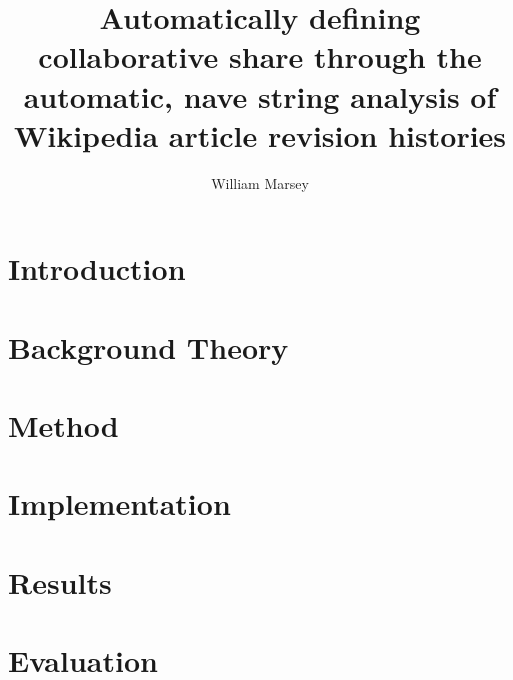 \documentclass[a4paper,11pt,twoside]{report}
\begin{document}
\title{\LARGE {\bf Automatically defining collaborative share through
    the automatic, nave string analysis of Wikipedia article
    revision histories}\\
 \vspace*{6mm}
}

\author{William Marsey}

\maketitle

\preface



\body
{}
\chapter{Introduction}
\label{ch:introduction}


\chapter{Background Theory}
\label{ch:background}





\chapter{Method}
\label{chap:method}




\chapter{Implementation}
\label{ch:implementation}




\chapter{Results}
\label{ch:results}




\chapter{Evaluation}
\label{ch:evaluation}



\end{document}
